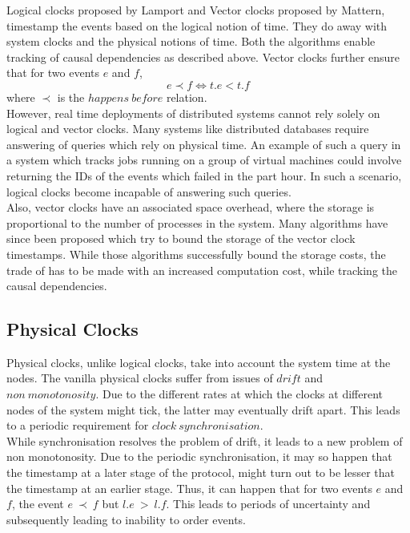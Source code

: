 \documentclass{article}
\begin{document}
    Logical clocks\cite{lc} proposed by Lamport and Vector clocks\cite{vc} proposed by Mattern, timestamp the events based on the logical notion of time. They do away with system clocks and the physical notions of time. Both the algorithms enable tracking of causal dependencies as described above. Vector clocks further ensure that for two events $e$ and $f$, $$e \prec f \iff t.e < t.f$$ where $\prec$ is the $happens\ before$ relation. \\

    However, real time deployments of distributed systems cannot rely solely on logical and vector clocks. Many systems like distributed databases require answering of queries which rely on physical time. An example of such a query in a system which tracks jobs running on a group of virtual machines could involve returning the IDs of the events which failed in the part hour. In such a scenario, logical clocks become incapable of answering such queries. \\

    Also, vector clocks have an associated space overhead, where the storage is proportional to the number of processes in the system. Many algorithms have since been proposed which try to bound the storage of the vector clock timestamps. While those algorithms successfully bound the storage costs, the trade of has to be made with an increased computation cost, while tracking the causal dependencies.

    \subsection{Physical Clocks}

    Physical clocks, unlike logical clocks, take into account the system time at the nodes. The vanilla physical clocks suffer from issues of $drift$ and $non\ monotonosity$. Due to the different rates at which the clocks at different nodes of the system might tick, the latter may eventually drift apart. This leads to a periodic requirement for $clock\ synchronisation$. \\

    While synchronisation resolves the problem of drift, it leads to a new problem of non monotonosity. Due to the periodic synchronisation, it may so happen that the timestamp at a later stage of the protocol, might turn out to be lesser that the timestamp at an earlier stage. Thus, it can happen that for two events $e$ and $f$, the event $e\ \prec\ f$ but $l.e\ >\ l.f$. This leads to periods of uncertainty and subsequently leading to inability to order events.
\end{document}
